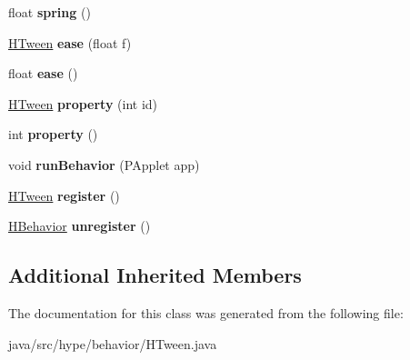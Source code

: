 \begin{DoxyCompactItemize}
\item 
\hypertarget{classhype_1_1behavior_1_1_h_tween_a0ef1eb7d510b05aebfb8f9c008eb0c72}{float {\bfseries spring} ()}\label{classhype_1_1behavior_1_1_h_tween_a0ef1eb7d510b05aebfb8f9c008eb0c72}

\item 
\hypertarget{classhype_1_1behavior_1_1_h_tween_a44ae3b25b5a0e8715c3138c2abbfde46}{\hyperlink{classhype_1_1behavior_1_1_h_tween}{H\-Tween} {\bfseries ease} (float f)}\label{classhype_1_1behavior_1_1_h_tween_a44ae3b25b5a0e8715c3138c2abbfde46}

\item 
\hypertarget{classhype_1_1behavior_1_1_h_tween_a78b86c77cd6979a729081f59ba966f18}{float {\bfseries ease} ()}\label{classhype_1_1behavior_1_1_h_tween_a78b86c77cd6979a729081f59ba966f18}

\item 
\hypertarget{classhype_1_1behavior_1_1_h_tween_a7f0d7cd38ab1ca1650b5ee561a367872}{\hyperlink{classhype_1_1behavior_1_1_h_tween}{H\-Tween} {\bfseries property} (int id)}\label{classhype_1_1behavior_1_1_h_tween_a7f0d7cd38ab1ca1650b5ee561a367872}

\item 
\hypertarget{classhype_1_1behavior_1_1_h_tween_a9ed83d075e0e6f13117f47dc33cbd35f}{int {\bfseries property} ()}\label{classhype_1_1behavior_1_1_h_tween_a9ed83d075e0e6f13117f47dc33cbd35f}

\item 
\hypertarget{classhype_1_1behavior_1_1_h_tween_ac12d69a33663b6c1ece91571cacfbefa}{void {\bfseries run\-Behavior} (P\-Applet app)}\label{classhype_1_1behavior_1_1_h_tween_ac12d69a33663b6c1ece91571cacfbefa}

\item 
\hypertarget{classhype_1_1behavior_1_1_h_tween_acc1ec1b56ea2daf3188308a1029e31f6}{\hyperlink{classhype_1_1behavior_1_1_h_tween}{H\-Tween} {\bfseries register} ()}\label{classhype_1_1behavior_1_1_h_tween_acc1ec1b56ea2daf3188308a1029e31f6}

\item 
\hypertarget{classhype_1_1behavior_1_1_h_tween_a3ad9f4805d56e94f4b1b4b56efb1fbab}{\hyperlink{classhype_1_1behavior_1_1_h_behavior}{H\-Behavior} {\bfseries unregister} ()}\label{classhype_1_1behavior_1_1_h_tween_a3ad9f4805d56e94f4b1b4b56efb1fbab}

\end{DoxyCompactItemize}
\subsection*{Additional Inherited Members}


The documentation for this class was generated from the following file\-:\begin{DoxyCompactItemize}
\item 
java/src/hype/behavior/H\-Tween.\-java\end{DoxyCompactItemize}
